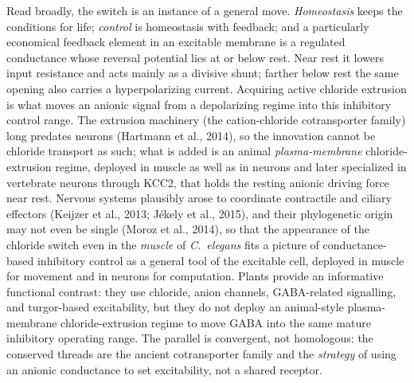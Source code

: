\documentclass[11pt,a4paper]{article}
\begin{document}
Read broadly, the switch is an instance of a general move. \emph{Homeostasis} keeps the conditions for life; \emph{control} is homeostasis with feedback; and a particularly economical feedback element in an excitable membrane is a regulated conductance whose reversal potential lies at or below rest. Near rest it lowers input resistance and acts mainly as a divisive shunt; farther below rest the same opening also carries a hyperpolarizing current. Acquiring active chloride extrusion is what moves an anionic signal from a depolarizing regime into this inhibitory control range. The extrusion machinery (the cation-chloride cotransporter family) long predates neurons (Hartmann et al., 2014), so the innovation cannot be chloride transport as such; what is added is an animal \emph{plasma-membrane} chloride-extrusion regime, deployed in muscle as well as in neurons and later specialized in vertebrate neurons through KCC2, that holds the resting anionic driving force near rest. Nervous systems plausibly arose to coordinate contractile and ciliary effectors (Keijzer et al., 2013; J\'ekely et al., 2015), and their phylogenetic origin may not even be single (Moroz et al., 2014), so that the appearance of the chloride switch even in the \emph{muscle} of \emph{C.~elegans} fits a picture of conductance-based inhibitory control as a general tool of the excitable cell, deployed in muscle for movement and in neurons for computation. Plants provide an informative functional contrast: they use chloride, anion channels, GABA-related signalling, and turgor-based excitability, but they do not deploy an animal-style plasma-membrane chloride-extrusion regime to move GABA into the same mature inhibitory operating range. The parallel is convergent, not homologous: the conserved threads are the ancient cotransporter family and the \emph{strategy} of using an anionic conductance to set excitability, not a shared receptor.
\end{document}
